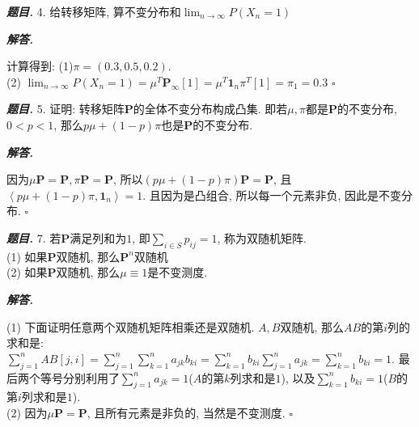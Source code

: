 \documentclass[10pt, a4paper, oneside]{ctexart}
\newenvironment{problem}{\begin{framed}\par\noindent\textbf{\textit{题目. }}}{\end{framed}\par}
\newenvironment{solution}{%
  \par\noindent\textbf{\textit{解答. }}\ignorespaces
}{%
  \hfill\ensuremath{\square}\par %
}
\begin{document}
\begin{problem}
    4. 给转移矩阵, 算不变分布和$\lim_{n\to\infty}P(X_n=1)$
\end{problem}
\begin{solution}
    计算得到: (1)$\pi=(0.3,0.5,0.2)$. \\(2) $\lim_{n\to \infty}P(X_n=1)=\mu^T\mathbf{P}_{\infty}[1]=\mu^T\mathbf{1}_n\pi^T[1]=\pi_1=0.3$
\end{solution}
\begin{problem}
5. 证明: 转移矩阵$\mathbf{P}$的全体不变分布构成凸集. 即若$\mu,\pi$都是$\mathbf{P}$的不变分布,$0<p<1$, 那么$p\mu+(1-p)\pi$也是$\mathbf{P}$的不变分布.
\end{problem}
\begin{solution}
因为$\mu\mathbf{P}=\mathbf{P}, \pi\mathbf{P}=\mathbf{P}$, 所以$(p\mu+(1-p)\pi)\mathbf{P}=\mathbf{P}$, 且$\left\langle p\mu+(1-p)\pi, \mathbf{1}_n \right\rangle=1$. 且因为是凸组合, 所以每一个元素非负, 因此是不变分布.
\end{solution}

\begin{problem}
    7. 若$\mathbf{P}$满足列和为$1$, 即$\sum_{i\in S}p_{ij}=1$, 称为双随机矩阵.\\
(1) 如果$\mathbf{P}$双随机, 那么$\mathbf{P}^n$双随机\\
(2) 如果$\mathbf{P}$双随机, 那么$\mu\equiv 1$是不变测度.
\end{problem}
\begin{solution}
(1) 下面证明任意两个双随机矩阵相乘还是双随机. $A,B$双随机, 那么$AB$的第$i$列的求和是: $\sum_{j=1}^n AB[j,i]=\sum_{j=1}^n \sum_{k=1}^n a_{jk}b_{ki}=\sum_{k=1}^n b_{ki}\sum_{j=1}^n a_{jk}=\sum_{k=1}^n b_{ki}=1$. 最后两个等号分别利用了$\sum_{j=1}^n a_{jk}=1$($A$的第$k$列求和是$1$), 以及$\sum_{k=1}^n b_{ki}=1$($B$的第$i$列求和是$1$).\\
(2) 因为$\mu \mathbf{P}=\mathbf{P}$, 且所有元素是非负的, 当然是不变测度.
\end{solution}
\end{document}
